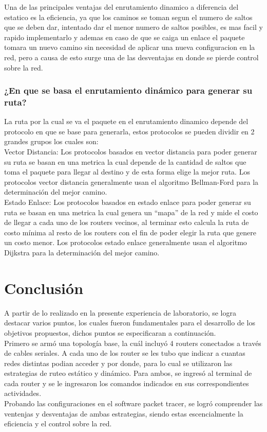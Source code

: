 \documentclass[spanish]{udpreport}
\begin{document}
Una de las principales ventajas del enrutamiento dinamico a diferencia del estatico es la eficiencia, ya que los caminos se toman segun el numero de saltos que se deben dar, intentado dar el menor numero de saltos posibles, es mas facil y rapido implementarlo y ademas en caso de que se caiga un enlace el paquete tomara un nuevo camino sin necesidad de aplicar una nueva configuracion en la red, pero a causa de esto surge una de las desventajas en donde se pierde control sobre la red.\\

\subsection{¿En que se basa el enrutamiento dinámico para generar su ruta?}

La ruta por la cual se va el paquete en el enrutamiento dinamico depende del protocolo en que se base para generarla, estos protocolos se pueden dividir en 2 grandes grupos los cuales son:\\

Vector Distancia: Los protocolos basados en vector distancia para poder generar su ruta se basan en una metrica la cual depende de la cantidad de saltos que toma el paquete para llegar al destino y de esta forma elige la mejor ruta. Los protocolos vector distancia generalmente usan el algoritmo Bellman-Ford para la determinación del mejor camino.\\

Estado Enlace: Los protocolos basados en estado enlace para poder generar su ruta se basan en una metrica la cual genera un “mapa” de la red y mide el costo de llegar a cada uno de los routers vecinos, al terminar esto calcula la ruta de costo mínima al resto de los routers  con el fin de poder elegir la ruta que genere un costo menor. Los protocolos estado enlace generalmente usan el algoritmo Dijkstra para la determinación del mejor camino.\\

\chapter{Conclusión}

A partir de lo realizado en la presente experiencia de laboratorio, se logra destacar varios puntos, los cuales fueron fundamentales para el desarrollo de los objetivos propuestos, dichos puntos se especificaran a continuación.\\
Primero se armó una topología base, la cuál incluyó 4 routers conectados a través de cables seriales.
A cada uno de los router se les tubo que indicar a cuantas redes distintas podian acceder y por donde, para lo cual se utilizaron las estrategias de ruteo estático y dinámico.
Para ambos, se ingresó al terminal de cada router y se le ingresaron los comandos indicados en sus correspondientes actividades.\\
Probando las configuraciones en el software packet tracer, se logró comprender las ventenjas y desventajas de ambas estrategias, siendo estas escencialmente la eficiencia y el control sobre la red. 
\end{document}
